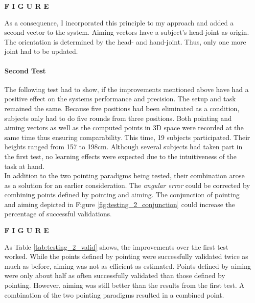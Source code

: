 \textbf{F I G U R E}

As a consequence, I incorporated this principle to my approach and added a second vector to the system. Aiming vectors have a subject's head-joint as origin. The orientation is determined by the head- and hand-joint. Thus, only one more joint had to be updated.

\paragraph{Second Test} The following test had to show, if the improvements mentioned above have had a positive effect on the systems performance and precision. The setup and task remained the same. Because five positions had been eliminated as a condition, subjects only had to do five rounds from three positions. Both pointing and aiming vectors as well as the computed points in \ac{3D} space were recorded at the same time thus ensuring comparability. This time, 19 subjects participated. Their heights ranged from 157 to 198cm. Although several subjects had taken part in the first test, no learning effects were expected due to the intuitiveness of the task at hand. 
\\
In addition to the two pointing paradigms being tested, their combination arose as a solution for an earlier consideration. The \textit{angular error} could be corrected by combining points defined by pointing and aiming. The conjunction of pointing and aiming depicted in Figure \ref{fig:testing_2_conjunction} could increase the percentage of successful validations.

\textbf{F I G U R E}

As Table \ref{tab:testing_2_valid} shows, the improvements over the first test worked. While the points defined by pointing were successfully validated twice as much as before, aiming was not as efficient as estimated. Points defined by aiming were only about half as often successfully validated than those defined by pointing. However, aiming was still better than the results from the first test. A combination of the two pointing paradigms resulted in a combined point.

